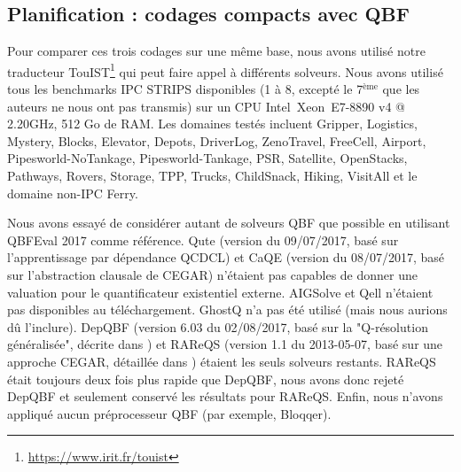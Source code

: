 \subsection{Planification : codages compacts avec QBF}

Pour comparer ces trois codages sur une même base, nous avons utilisé notre traducteur TouIST\footnote{\url{https://www.irit.fr/touist}} \cite{DBLP:journals/corr/SlimaneCGHLMV15} qui peut faire appel à différents solveurs.
Nous avons utilisé tous les benchmarks IPC STRIPS disponibles (1 à 8, excepté le 7$^{\text{ème}}$ que les auteurs ne nous ont pas transmis) sur un CPU Intel\textregistered\ Xeon\textregistered\ E7-8890 v4 @ 2.20GHz, 512 Go de RAM. Les domaines testés incluent Gripper, Logistics, Mystery, Blocks, Elevator, Depots, DriverLog, ZenoTravel, FreeCell, Airport, Pipesworld-NoTankage, Pipesworld-Tankage, PSR, Satellite, OpenStacks, Pathways, Rovers, Storage, TPP, Trucks, ChildSnack, Hiking, VisitAll et le domaine non-IPC Ferry.

Nous avons essayé de considérer autant de solveurs QBF que possible en utilisant QBFEval 2017 comme référence. Qute (version du 09/07/2017, basé sur l'apprentissage par dépendance QCDCL) et CaQE (version du 08/07/2017, basé sur l'abstraction clausale de CEGAR) n'étaient pas capables de donner une valuation pour le quantificateur existentiel externe. AIGSolve et Qell n'étaient pas disponibles au téléchargement. GhostQ n'a pas été utilisé (mais nous aurions dû l'inclure). DepQBF (version 6.03 du 02/08/2017, basé sur la "Q-résolution généralisée", décrite dans \cite{DBLP:conf/cade/LonsingE17}) et RAReQS (version 1.1 du 2013-05-07, basé sur une approche CEGAR, détaillée dans \cite{DBLP:conf/sat/JanotaKMC12}) étaient les seuls solveurs restants. RAReQS était toujours deux fois plus rapide que DepQBF, nous avons donc rejeté DepQBF et seulement conservé les résultats pour RAReQS. Enfin, nous n'avons appliqué aucun préprocesseur QBF (par exemple, Bloqqer).


